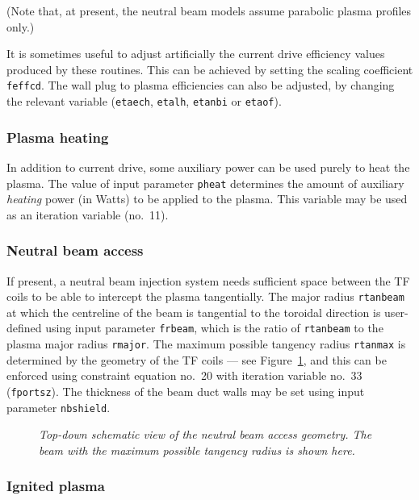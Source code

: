\documentclass[11pt,a4paper]{report}
\begin{document}
(Note that, at present, the neutral beam models assume parabolic plasma
profiles only.)

It is sometimes useful to adjust artificially the current drive efficiency
values produced by these routines. This can be achieved by setting the scaling
coefficient \texttt{feffcd}. The wall plug to plasma efficiencies can also be
adjusted, by changing the relevant variable (\texttt{etaech}, \texttt{etalh},
\texttt{etanbi} or \texttt{etaof}).

\subsubsection{Plasma heating}

In addition to current drive, some auxiliary power can be used purely to heat
the plasma. The value of input parameter \texttt{pheat} determines the amount
of auxiliary \textit{heating}\/ power (in Watts) to be applied to the
plasma. This variable may be used as an iteration variable (no.\ 11).

\subsubsection{Neutral beam access}

If present, a neutral beam injection system needs sufficient space between the
TF coils to be able to intercept the plasma tangentially. The major radius
\texttt{rtanbeam} at which the centreline of the beam is tangential to the
toroidal direction is user-defined using input parameter \texttt{frbeam},
which is the ratio of \texttt{rtanbeam} to the plasma major radius
\texttt{rmajor}. The maximum possible tangency radius \texttt{rtanmax} is
determined by the geometry of the TF coils --- see Figure~\ref{fig:portsize},
and this can be enforced using constraint equation no.\ 20 with iteration
variable no.\ 33 (\texttt{fportsz}). The thickness of the beam duct walls may
be set using input parameter \texttt{nbshield}.

\begin{figure}[tbph]
\caption[Schematic diagram of the neutral beam access geometry]
{\label{fig:portsize}
  \textit{Top-down schematic view of the neutral beam access geometry. The beam
    with the maximum possible tangency radius is shown here.}
}
\end{figure}

\subsubsection{Ignited plasma}
\label{sec:ignited}
\end{document}
